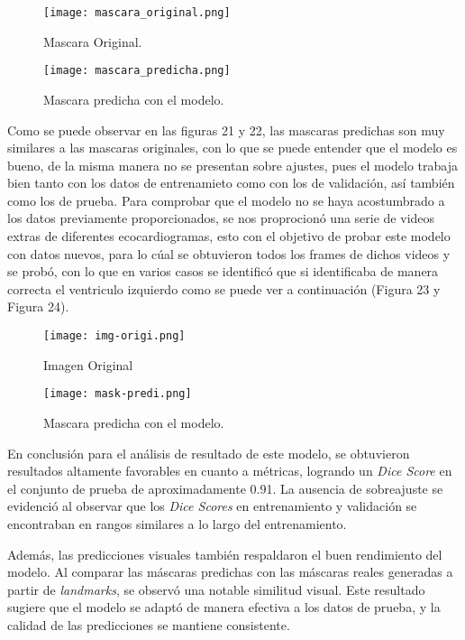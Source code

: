 \documentclass[runningheads]{llncs}
\begin{document}
\begin{figure} [H]
    \centering
    \texttt{[image: mascara\_original.png]}
    \caption{Mascara Original.}
    \label{fig:fig8}
\end{figure}
\begin{figure} [H]
    \centering
    \texttt{[image: mascara\_predicha.png]}
    \caption{Mascara predicha con el modelo.}
    \label{fig:fig8}
\end{figure}


Como se puede observar en las figuras 21 y 22, las mascaras predichas son muy similares a las mascaras originales, con lo que se puede entender que el modelo es bueno, de la misma manera no se presentan sobre ajustes, pues el modelo trabaja bien tanto con los datos de entrenamieto como con los de validación, así también como los de prueba. Para comprobar que el modelo no se haya acostumbrado a los datos previamente proporcionados, se nos proprocionó una serie de videos extras de diferentes ecocardiogramas, esto con el objetivo de probar este modelo con datos nuevos, para lo cúal se obtuvieron todos los frames de dichos videos y se probó, con lo que en varios casos se identificó que si identificaba de manera correcta el ventriculo izquierdo como se puede ver a continuación (Figura 23 y Figura 24).

\begin{figure} [H]
    \centering
    \texttt{[image: img-origi.png]}
    \caption{Imagen Original}
    \label{fig:fig8}
\end{figure}
\begin{figure} [H]
    \centering
    \texttt{[image: mask-predi.png]}
    \caption{Mascara predicha con el modelo.}
    \label{fig:fig8}
\end{figure}

En conclusión para el análisis de resultado de este modelo, se obtuvieron resultados altamente favorables en cuanto a métricas, logrando un \textit{Dice Score} en el conjunto de prueba de aproximadamente 0.91. La ausencia de sobreajuste se evidenció al observar que los \textit{Dice Scores} en entrenamiento y validación se encontraban en rangos similares a lo largo del entrenamiento.

Además, las predicciones visuales también respaldaron el buen rendimiento del modelo. Al comparar las máscaras predichas con las máscaras reales generadas a partir de \textit{landmarks}, se observó una notable similitud visual. Este resultado sugiere que el modelo se adaptó de manera efectiva a los datos de prueba, y la calidad de las predicciones se mantiene consistente.
\end{document}
